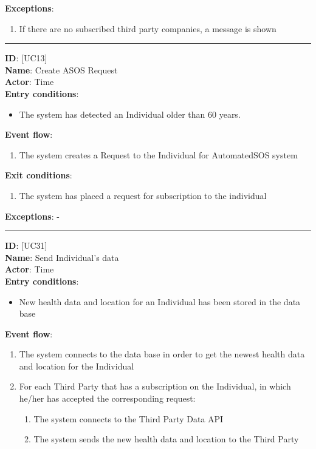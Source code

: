 \documentclass[a4paper, hidelinks, 12pt]{report}
\newcommand\usecase[1]{ [UC#1] }
\begin{document}
\begin{itemize}
		\textbf{Exceptions}:
  		\begin{enumerate}
			\item{If there are no subscribed third party companies, a message is shown}
		\end{enumerate}
		\rule{\linewidth}{0.4pt}
		\textbf{ID}: \usecase{13} \\
		\textbf{Name}: Create ASOS Request \\
		\textbf{Actor}: Time \\
		\textbf{Entry conditions}:
		\begin{itemize}
			\item{The system has detected an Individual older than 60 years.}
		\end{itemize}
		\textbf{Event flow}:
		\begin{enumerate}
			\item{The system creates a Request to the Individual for AutomatedSOS system}
		\end{enumerate}
		\textbf{Exit conditions}:
		\begin{enumerate}
			\item{The system has placed a request for subscription to the individual}
		\end{enumerate}
		\textbf{Exceptions}: - \\
		\rule{\linewidth}{0.4pt}
		\textbf{ID}: \usecase{31} \\
		\textbf{Name}: Send Individual's data \\
		\textbf{Actor}: Time \\
		\textbf{Entry conditions}:
		\begin{itemize}
			\item{New health data and location for an Individual has been stored in the data base}
		\end{itemize}
		\textbf{Event flow}:
		\begin{enumerate}
			\item{The system connects to the data base in order to get the newest health data and location for the Individual}
			\item{For each Third Party that has a subscription on the Individual, in which he/her has accepted the corresponding request:}
			\begin{enumerate}
				\item{The system connects to the Third Party Data API}
				\item{The system sends the new health data and location to the Third Party}
			\end{enumerate}

\end{enumerate}
\end{itemize}
\end{document}
